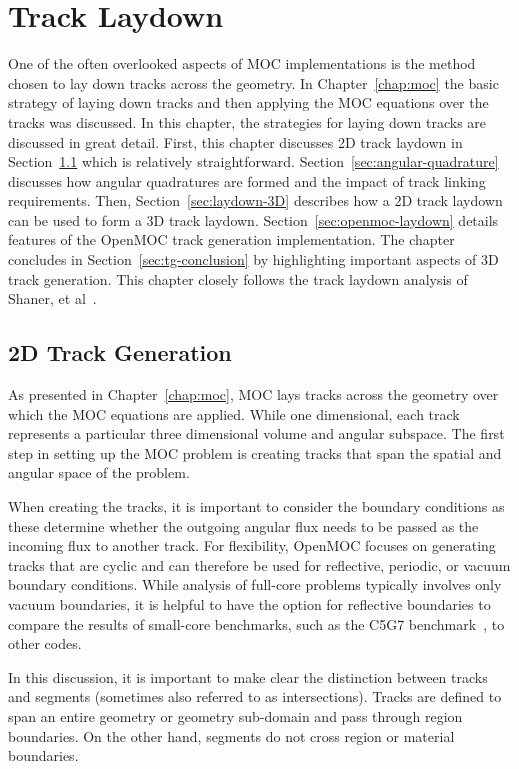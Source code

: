 \chapter{Track Laydown}
\label{chap:track-laydown}

One of the often overlooked aspects of \ac{MOC} implementations is the method chosen to lay down tracks across the geometry. In Chapter~\ref{chap:moc} the basic strategy of laying down tracks and then applying the \ac{MOC} equations over the tracks was discussed. In this chapter, the strategies for laying down tracks are discussed in great detail. First, this chapter discusses 2D track laydown in Section~\ref{sec:laydown-2D} which is relatively straightforward. Section~\ref{sec:angular-quadrature} discusses how angular quadratures are formed and the impact of track linking requirements. Then, Section~\ref{sec:laydown-3D} describes how a 2D track laydown can be used to form a 3D track laydown. Section~\ref{sec:openmoc-laydown} details features of the OpenMOC track generation implementation. The chapter concludes in Section~\ref{sec:tg-conclusion} by highlighting important aspects of 3D track generation. This chapter closely follows the track laydown analysis of Shaner, et al~\cite{shaner-laydown}.

\section{2D Track Generation}
\label{sec:laydown-2D}

As presented in Chapter~\ref{chap:moc}, \ac{MOC} lays tracks across the geometry over which the \ac{MOC} equations are applied. While one dimensional, each track represents a particular three dimensional volume and angular subspace. The first step in setting up the \ac{MOC} problem is creating tracks that span the spatial and angular space of the problem.

When creating the tracks, it is important to consider the boundary conditions as these determine whether the outgoing angular flux needs to be passed as the incoming flux to another track. For flexibility, OpenMOC focuses on generating tracks that are cyclic and can therefore be used for reflective, periodic, or vacuum boundary conditions. While analysis of full-core problems typically involves only vacuum boundaries, it is helpful to have the option for reflective boundaries to compare the results of small-core benchmarks, such as the C5G7 benchmark~\cite{c5g7}, to other codes. 

In this discussion, it is important to make clear the distinction between tracks and segments (sometimes also referred to as intersections). Tracks are defined to span an entire geometry or geometry sub-domain and pass through region boundaries. On the other hand, segments do not cross region or material boundaries.

